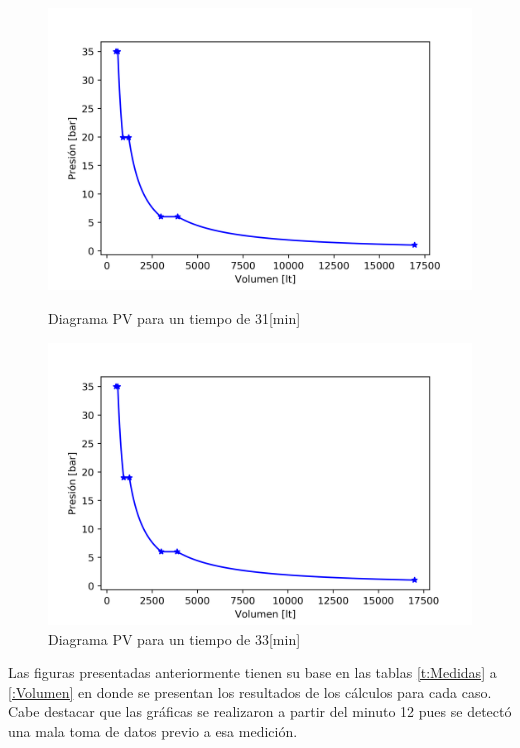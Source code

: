 \documentclass[11pt,letterpaper]{extarticle}        %
\numberwithin{equation}{section}                    %
\begin{document}
\begin{figure}[H]
\centering
\begin{minipage}{0.49\linewidth}
\centering
\includegraphics[width = \linewidth]{tiempo31}
\caption{Diagrama PV para un tiempo de 31[min]}
\label{f:t31}
\end{minipage}
\hfill
\begin{minipage}{0.49\linewidth}
\centering
\includegraphics[width = \linewidth]{tiempo33}
\caption{Diagrama PV para un tiempo de 33[min]}
\label{f:t33}
\end{minipage}
\end{figure}

Las figuras presentadas anteriormente tienen su base en las tablas \ref{t:Medidas} a \ref{:Volumen} en donde se presentan los resultados de los cálculos para cada caso. Cabe destacar que las gráficas se realizaron a partir del minuto 12 pues se detectó una mala toma de datos previo a esa medición.
\end{document}

